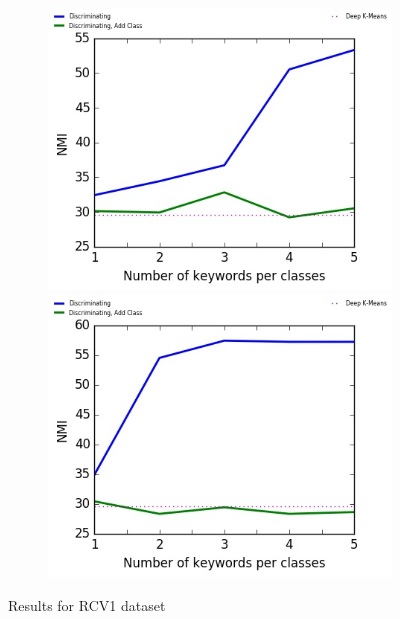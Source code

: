 \begin{figure}[!h]
\begin{subfigure}[b]{\textwidth}
\begin{minipage}{0.5\linewidth}
\centering
  \includegraphics[scale=0.49]{parts/res/dat_file/nmi/RCV1.jpg}     
\end{minipage}
  \begin{minipage}{0.5\linewidth}
\centering
   \includegraphics[scale=0.49]{parts/res/dat_file/nmi/RCV1_simple.jpg}     
\end{minipage}
\end{subfigure}
\caption{\label{fig:rcv1}Results for RCV1 dataset}
\end{figure}



